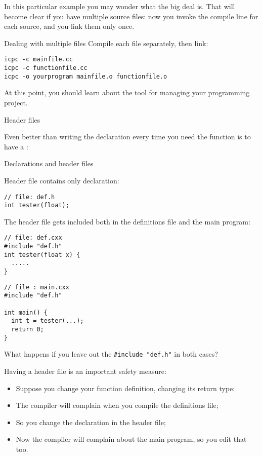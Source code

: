 In this particular example you may wonder what the big deal is.
That will become clear if you have multiple source files: now you
invoke the compile line for each source, and you link them only once.

\begin{block}{Dealing with multiple files}
  \label{sl:link-multiple}
  Compile each file separately, then link:
\begin{verbatim}
icpc -c mainfile.cc
icpc -c functionfile.cc
icpc -o yourprogram mainfile.o functionfile.o
\end{verbatim}  
\end{block}

At this point, you should learn about the  tool for
managing your programming project.

 {Header files}
\label{sec:headerfile}
\label{sec:hfile}

Even better than writing the declaration every time you need the
function is to have a :

\begin{block}{Declarations and header files}
  \label{sl:proto-header}
  \begin{multicols}{2}
    Header file contains only declaration:
    \columnbreak
\begin{lstlisting}
// file: def.h
int tester(float);
\end{lstlisting}
\end{multicols}

The header file gets included both in the definitions file and the
main program:
\begin{multicols}{2}  
\begin{lstlisting}
// file: def.cxx
#include "def.h"
int tester(float x) {
  .....
}
\end{lstlisting}
\vfill\columnbreak
\begin{lstlisting}
// file : main.cxx
#include "def.h"

int main() {
  int t = tester(...);
  return 0;
}
\end{lstlisting}
\end{multicols}
What happens if you leave out the \lstinline$#include "def.h"$ in both cases?
\end{block}

Having a header file is an important safety measure:
\begin{itemize}
\item Suppose you change your function definition, changing its return
  type:
\item The compiler will complain when you compile the definitions
  file;
\item So you change the declaration in the header file;
\item Now the compiler will complain about the main program, so you
  edit that too.
\end{itemize}

